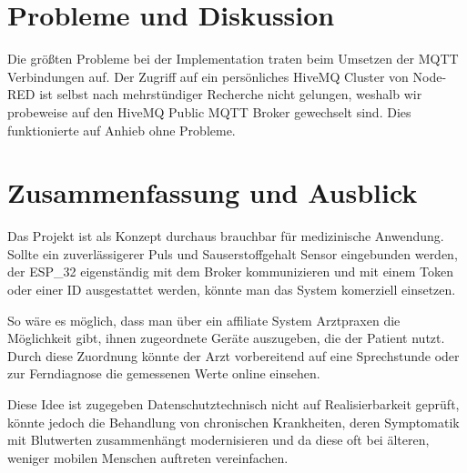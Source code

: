 \documentclass[12pt,oneside]{article}
\begin{document}
  
  \section{Probleme und Diskussion}
	Die grö\ss ten Probleme bei der Implementation traten beim Umsetzen der MQTT Verbindungen auf. Der Zugriff auf ein persönliches HiveMQ Cluster von Node-RED ist selbst nach mehrstündiger Recherche nicht gelungen, weshalb wir probeweise auf den HiveMQ Public MQTT Broker gewechselt sind. Dies funktionierte auf Anhieb ohne Probleme.
  
  
  \section{Zusammenfassung und Ausblick}
	Das Projekt ist als Konzept durchaus brauchbar für medizinische Anwendung. Sollte ein zuverlässigerer Puls und Sauserstoffgehalt Sensor eingebunden werden, der ESP\_32 eigenständig mit dem Broker kommunizieren und mit einem Token oder einer ID ausgestattet werden, könnte man das System komerziell einsetzen.\par
	So wäre es möglich, dass man über ein affiliate System Arztpraxen die Möglichkeit gibt, ihnen zugeordnete Geräte auszugeben, die der Patient nutzt. Durch diese Zuordnung könnte der Arzt vorbereitend auf eine Sprechstunde oder zur Ferndiagnose die gemessenen Werte online einsehen. \par
	Diese Idee ist zugegeben Datenschutztechnisch nicht auf Realisierbarkeit geprüft, könnte jedoch die Behandlung von chronischen Krankheiten, deren Symptomatik mit Blutwerten zusammenhängt modernisieren und da diese oft bei älteren, weniger mobilen Menschen auftreten vereinfachen.
  
  \clearpage 
  
  \listoffigures
  \lstlistoflistings
  
  
  
  
\end{document}
